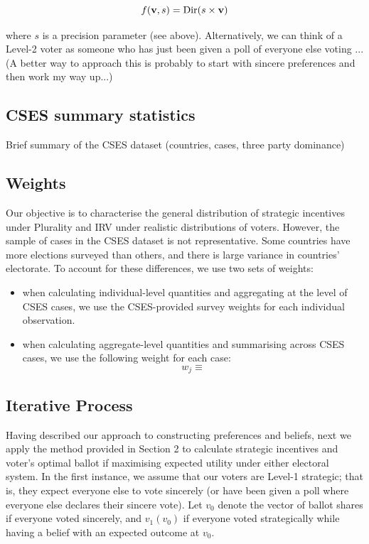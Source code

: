 \documentclass[12pt, letter]{article}
\begin{document}
\begin{equation}
	f({\bf v}, s) = \text{Dir}(s \times {\bf v})
\end{equation}

where $s$ is a precision parameter (see above). Alternatively, we can think of a Level-2 voter as someone who has just been given a poll of everyone else voting ...(A better way to approach this is probably to start with sincere preferences and then work my way up...)

\subsection{CSES summary statistics}

Brief summary of the CSES dataset (countries, cases, three party dominance)

\subsection{Weights}

Our objective is to characterise the general distribution of strategic incentives under Plurality and IRV under realistic distributions of voters. However, the sample of cases in the CSES dataset is not representative. Some countries have more elections surveyed than others, and there is large variance in countries' electorate. To account for these differences, we use two sets of weights:

\begin{itemize}
	\item when calculating individual-level quantities and aggregating at the level of CSES cases, we use the CSES-provided survey weights for each individual observation.
	\item when calculating aggregate-level quantities and summarising across CSES cases, we use the following weight for each case:
	\begin{equation}
		w_j \equiv 
	\end{equation}
\end{itemize}

\subsection{Iterative Process}

Having described our approach to constructing preferences and beliefs, next we apply the method provided in Section 2 to calculate strategic incentives and voter's optimal ballot if maximising expected utility under either electoral system. In the first instance, we assume that our voters are Level-1 strategic; that is, they expect everyone else to vote sincerely (or have been given a poll where everyone else declares their sincere vote). Let $v_0$ denote the vector of ballot shares if everyone voted sincerely, and $v_1(v_0)$ if everyone voted strategically while having a belief with an expected outcome at $v_0$. 
\end{document}
